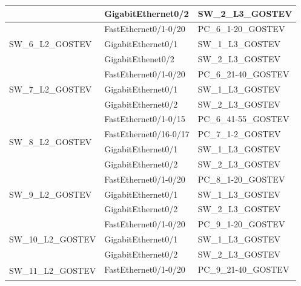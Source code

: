 \documentclass[14pt, a4paper]{extarticle}
\numberwithin{equation}{section}
\begin{document}
\begin{table}[H]
\begin{tabular}{|l|l|l|}
                                    & GigabitEthernet0/2       & SW\_2\_L3\_GOSTEV             \\ \hline
\multirow{3}{*}{SW\_6\_L2\_GOSTEV}  & FastEthernet0/1-0/20     & PC\_6\_1-20\_GOSTEV           \\ \cline{2-3} 
                                    & GigabitEthernet0/1       & SW\_1\_L3\_GOSTEV             \\ \cline{2-3} 
                                    & GigabitEthenet0/2        & SW\_2\_L3\_GOSTEV             \\ \hline
\multirow{3}{*}{SW\_7\_L2\_GOSTEV}  & FastEthernet0/1-0/20     & PC\_6\_21-40\_GOSTEV          \\ \cline{2-3} 
                                    & GigabitEthernet0/1       & SW\_1\_L3\_GOSTEV             \\ \cline{2-3} 
                                    & GigabitEthernet0/2       & SW\_2\_L3\_GOSTEV             \\ \hline
\multirow{4}{*}{SW\_8\_L2\_GOSTEV}  & FastEthernet0/1-0/15     & PC\_6\_41-55\_GOSTEV          \\ \cline{2-3} 
                                    & FastEthernet0/16-0/17    & PC\_7\_1-2\_GOSTEV            \\ \cline{2-3} 
                                    & GigabitEthernet0/1      & SW\_1\_L3\_GOSTEV             \\ \cline{2-3} 
                                    & GigabitEthernet0/2       & SW\_2\_L3\_GOSTEV             \\ \hline
\multirow{3}{*}{SW\_9\_L2\_GOSTEV}  & FastEthernet0/1-0/20     & PC\_8\_1-20\_GOSTEV           \\ \cline{2-3} 
                                    & GigabitEthernet0/1       & SW\_1\_L3\_GOSTEV             \\ \cline{2-3} 
                                    & GigabitEthernet0/2       & SW\_2\_L3\_GOSTEV             \\ \hline
\multirow{3}{*}{SW\_10\_L2\_GOSTEV} & FastEthernet0/1-0/20     & PC\_9\_1-20\_GOSTEV           \\ \cline{2-3} 
                                    & GigabitEthernet0/1       & SW\_1\_L3\_GOSTEV             \\ \cline{2-3} 
                                    & GigabitEthernet0/2       & SW\_2\_L3\_GOSTEV             \\ \hline
\multirow{3}{*}{SW\_11\_L2\_GOSTEV} & FastEthernet0/1-0/20     & PC\_9\_21-40\_GOSTEV          \\ \cline{2-3} 

\end{tabular}
\end{table}
\end{document}
